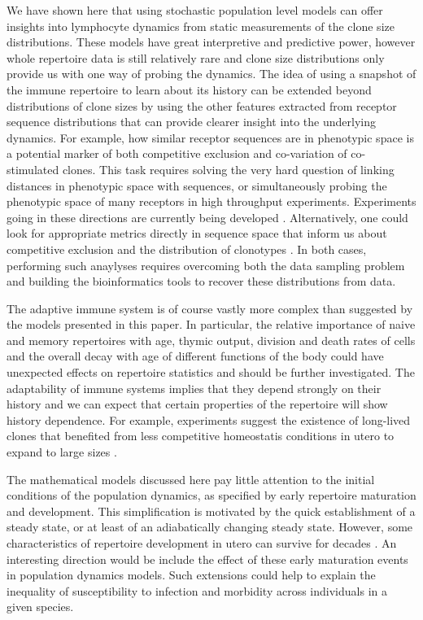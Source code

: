 \documentclass[aps,pre,twocolumn,superscriptaddress,groupedaddress]{revtex4}
\newcommand{\<}{\langle}
\renewcommand{\>}{\rangle}
\begin{document}
We have shown here that using stochastic population level models can offer insights into lymphocyte dynamics from static measurements of the clone size distributions. These models have great interpretive and predictive power, however whole repertoire data is still relatively rare and clone size distributions only provide us with one way of probing the dynamics. The idea of using a snapshot of the immune repertoire to learn about its history can be extended beyond distributions of clone sizes by using the other features extracted from receptor sequence distributions that can provide clearer insight into the underlying dynamics. For example, how similar receptor sequences are in phenotypic space is a potential marker of both competitive exclusion and co-variation of co-stimulated clones. This task requires solving the very hard question of linking distances in phenotypic space with sequences, or simultaneously probing the phenotypic space of many receptors in high throughput experiments. Experiments going in these directions are currently being developed \cite{Adams2016, Boyer2016a}. Alternatively, one could look for appropriate metrics directly in sequence space that inform us about competitive exclusion and the distribution of clonotypes \cite{chain-2014, Epstein2014}. In both cases,  performing such anaylyses requires overcoming both the data sampling problem and building the bioinformatics tools to recover these distributions from data.

The adaptive immune system is of course vastly more complex than suggested by the models presented in this paper. In particular, the relative importance of naive and memory repertoires with age, thymic output, division and death rates of cells and the overall decay with age of different functions of the body could have unexpected effects on repertoire statistics and should be further investigated. The adaptability of immune systems implies that they depend strongly on their history and we can expect that certain properties of the repertoire will show history dependence. For example, experiments suggest the existence of long-lived clones that benefited from less competitive homeostatis conditions in utero to expand to large sizes \cite{Pogorelyy2016}. 

The mathematical models discussed here pay little attention to the initial conditions of the population dynamics, as specified by early repertoire maturation and  development. This simplification is motivated by the quick establishment of a steady state, or at least of an adiabatically changing steady state. However, some characteristics of repertoire development in utero can survive for decades \cite{Pogorelyy2016}. An interesting direction would be include the effect of these early maturation events in population dynamics models. Such extensions could help to explain the inequality of susceptibility to infection and morbidity across individuals in a given species.  
\end{document}
